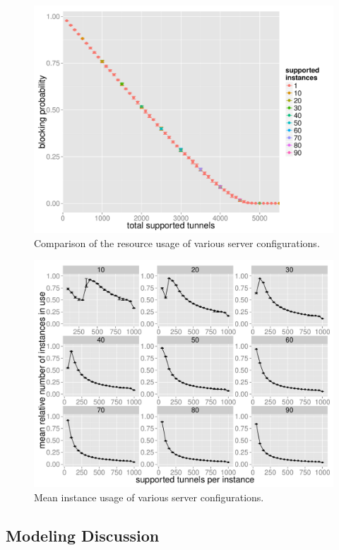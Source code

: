 \begin{figure}[htbp]
  \centering
  \includegraphics[width=1.0\textwidth]{images/feasiblemultiserver-blockprob.pdf}
  \caption{Comparison of the resource usage of various server configurations.}
 \label{c4:fig:res-usage-multiserver}
\end{figure}

\begin{figure}[htbp]
  \centering
  \includegraphics[width=1.0\textwidth]{images/instanceuse-mean.pdf}
  \caption{Mean instance usage of various server configurations.}
 \label{c4:fig:res-instance-usage-mean}
\end{figure}




\subsection{Modeling Discussion}

